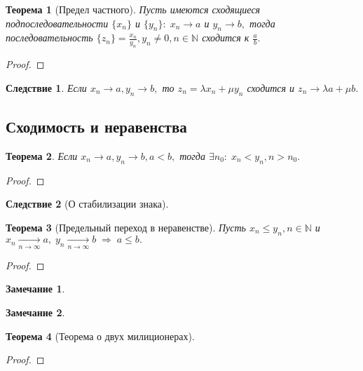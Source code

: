 \documentclass{article}
\newtheorem{Theorem}{Теорема}[section]
\newtheorem{Corollary}{Следствие}[section]
\newtheorem{Remark}{Замечание}[section]
\begin{document}
\begin{Theorem}[Предел частного]
Пусть имеются сходящиеся подпоследовательности $\{x_n\}$ и $\{y_n\}: \; x_n\rightarrow a$ и $y_n\rightarrow b,$ тогда последовательность $\{z_n\}=\frac{x_n}{y_n}, y_n\neq 0, n\in\mathbb{N}$ сходится к $\frac{a}{b}.$
\end{Theorem}
\begin{proof}
\end{proof}
\begin{Corollary}
Если $x_n\rightarrow a, y_n\rightarrow b,$ то $z_n=\lambda x_n+\mu y_n$ сходится и $z_n\rightarrow\lambda a+\mu b.$
\end{Corollary}
\subsection{Сходимость и неравенства}
\begin{Theorem}
Если $x_n\rightarrow a, y_n\rightarrow b, a<b,$ тогда $\exists n_0: \; x_n<y_n, n>n_0.$
\end{Theorem}
\begin{proof}

\end{proof}
\begin{Corollary}[О стабилизации знака]
\end{Corollary}
\begin{Theorem}[Предельный переход в неравенстве]
Пусть $x_n\leq y_n, n\in\mathbb{N}$ и\\ $x_n\xrightarrow[n\rightarrow\infty]{} a,\; y_n\xrightarrow[n\rightarrow\infty]{} b\;  \Rightarrow \;a\leq b.$
\end{Theorem}
\begin{proof}

\end{proof}

\begin{Remark}

\end{Remark}

\begin{Remark}

\end{Remark}

\begin{Theorem}[Теорема о двух милиционерах]

\end{Theorem}
\begin{proof}

\end{proof}
\end{document}
